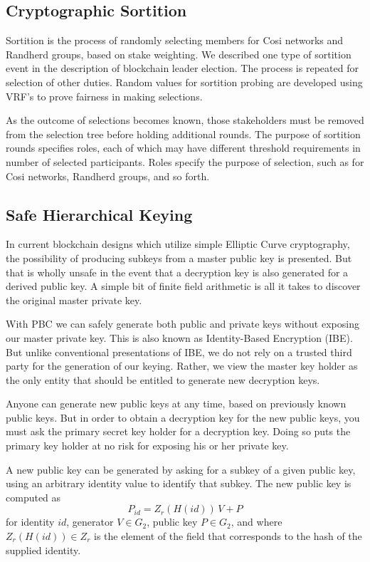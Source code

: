 \documentclass{yellowpaper}
\begin{document}
\subsection{Cryptographic Sortition}
Sortition\cite{algorand} is the process of randomly selecting members for Cosi networks and Randherd groups, based on stake weighting. We described one type of sortition event in the description of blockchain leader election. The process is repeated for selection of other duties. Random values for sortition probing are developed using VRF's to prove fairness in making selections.

As the outcome of selections becomes known, those stakeholders must be removed from the selection tree before holding additional rounds. The purpose of sortition rounds specifies roles, each of which may have different threshold requirements in number of selected participants. Roles specify the purpose of selection, such as for Cosi networks, Randherd groups, and so forth.

\subsection{Safe Hierarchical Keying}

In current blockchain designs which utilize simple Elliptic Curve cryptography, the possibility of producing subkeys from a master public key is presented. But that is wholly unsafe in the event that a decryption key is also generated for a derived public key. A simple bit of finite field arithmetic is all it takes to discover the original master private key.

With PBC we can safely generate both public and private keys without exposing our master private key. This is also known as Identity-Based Encryption (IBE). But unlike conventional presentations of IBE, we do not rely on a trusted third party for the generation of our keying. Rather, we view the master key holder as the only entity that should be entitled to generate new decryption keys. 

Anyone can generate new public keys at any time, based on previously known public keys.
But in order to obtain a decryption key for the new public keys, you must ask the primary secret key holder for a decryption key. Doing so puts the primary key holder at no risk for exposing his or her private key.

A new public key can be generated by asking for a subkey of a given public key, using an arbitrary identity value to identify that subkey. The new public key is computed as 
$$ P_{id} = Z_r(H(id)) \, V + P$$ 
for identity $id$, generator $V \in G_2$, public key $P \in G_2$, and where $Z_r(H(id)) \in Z_r$ is the element of the field that corresponds to the hash of the supplied identity. 
\end{document}
